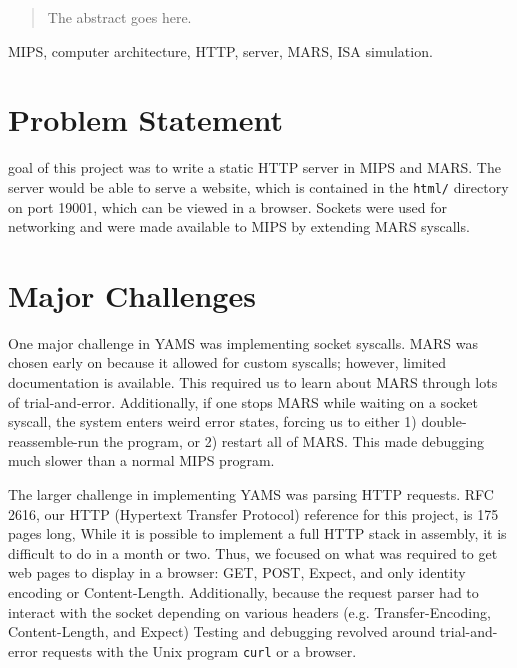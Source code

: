 \documentclass[journal,10pt]{IEEEtran}
\begin{document}
\maketitle

\begin{abstract}
The abstract goes here.
\end{abstract}

\begin{IEEEkeywords}
MIPS, computer architecture, HTTP, server, MARS, ISA simulation.
\end{IEEEkeywords}


\section{Problem Statement}
%
%
 goal of this project was to write a static HTTP server in
MIPS and MARS. The server would be able to serve a website, which is contained
in the \texttt{html/} directory on port 19001, which can be viewed in a browser.
Sockets were used for networking and were made available to MIPS by extending
MARS syscalls.


\section{Major Challenges}

One major challenge in YAMS was implementing socket syscalls.
MARS was chosen early on because it allowed for custom syscalls; however,
limited documentation is available. This required us to learn about MARS
through lots of trial-and-error. Additionally, if one stops MARS while
waiting on a socket syscall, the system enters weird error states, forcing
us to either 1) double-reassemble-run the program, or 2) restart all of MARS.
This made debugging much slower than a normal MIPS program.

The larger challenge in implementing YAMS was parsing HTTP requests. RFC
2616\cite{Leach}, our HTTP (Hypertext Transfer Protocol) reference for this
project, is 175 pages long, While it is possible to implement a full HTTP stack
in assembly, it is difficult to do in a month or two. Thus, we focused on what
was required to get web pages to display in a browser: GET, POST, Expect, and
only identity encoding or Content-Length. Additionally, because the request
parser had to interact with the socket depending on various headers (e.g.
Transfer-Encoding, Content-Length, and Expect) Testing and debugging revolved
around trial-and-error requests with the Unix program \texttt{curl} or a browser.
\end{document}
